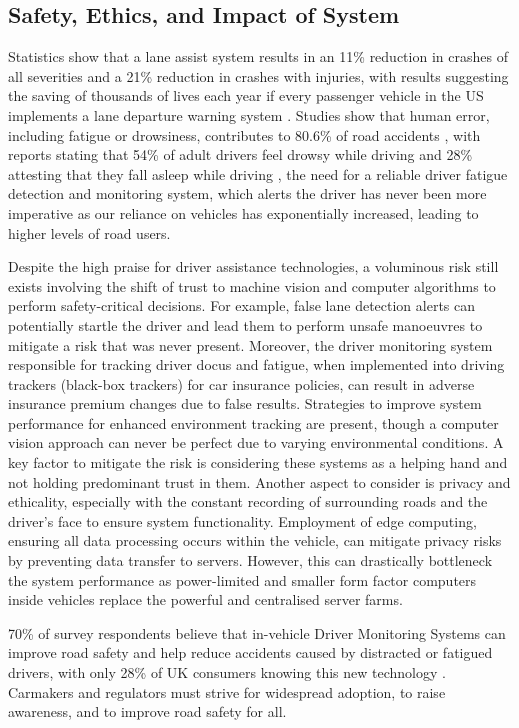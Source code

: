 \documentclass[10pt,conference]{IEEEtran}
\begin{document}
\subsection{Safety, Ethics, and Impact of System}

Statistics show that a lane assist system results in an 11\% reduction in crashes of all severities and a 21\% reduction in crashes with injuries, with results suggesting the saving of thousands of lives each year if every passenger vehicle in the US implements a lane departure warning system \cite{b23}. Studies show that human error, including fatigue or drowsiness, contributes to 80.6\% of road accidents \cite{b24}, with reports stating that 54\% of adult drivers feel drowsy while driving and 28\% attesting that they fall asleep while driving \cite{b25}, the need for a reliable driver fatigue detection and monitoring system, which alerts the driver has never been more imperative as our reliance on vehicles has exponentially increased, leading to higher levels of road users.

Despite the high praise for driver assistance technologies, a voluminous risk still exists involving the shift of trust to machine vision and computer algorithms to perform safety-critical decisions. For example, false lane detection alerts can potentially startle the driver and lead them to perform unsafe manoeuvres to mitigate a risk that was never present. Moreover, the driver monitoring system responsible for tracking driver docus and fatigue, when implemented into driving trackers (black-box trackers) for car insurance policies, can result in adverse insurance premium changes due to false results. Strategies to improve system performance for enhanced environment tracking are present, though a computer vision approach can never be perfect due to varying environmental conditions. A key factor to mitigate the risk is considering these systems as a helping hand and not holding predominant trust in them. Another aspect to consider is privacy and ethicality, especially with the constant recording of surrounding roads and the driver's face to ensure system functionality. Employment of edge computing, ensuring all data processing occurs within the vehicle, can mitigate privacy risks by preventing data transfer to servers. However, this can drastically bottleneck the system performance as power-limited and smaller form factor computers inside vehicles replace the powerful and centralised server farms.

70\% of survey respondents believe that in-vehicle Driver Monitoring Systems can improve road safety and help reduce accidents caused by distracted or fatigued drivers, with only 28\% of UK consumers knowing this new technology \cite{b26}. Carmakers and regulators must strive for widespread adoption, to raise awareness, and to improve road safety for all.
\end{document}
